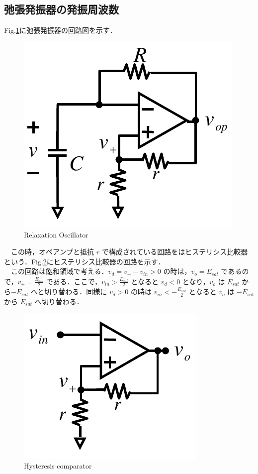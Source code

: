 \subsection{弛張発振器の発振周波数}
Fig.\ref{fig:Relaxation_Oscillator}に弛張発振器の回路図を示す．
\begin{figure}[H]
    \centering
    \includegraphics[scale=0.5]{./fig/Relaxation_Oscillator.pdf}
    \caption{Relaxation Oscillator}
    \label{fig:Relaxation_Oscillator}
\end{figure}

　この時，オペアンプと抵抗 $r$ で構成されている回路をはヒステリシス比較器という．Fig.\ref{fig:Hysteresis_comparator}にヒステリシス比較器の回路を示す．\\
　この回路は飽和領域で考える．$v_{d}=v_{+}-v_{i n}>0$ の時は，$v_{o}=E_{s a t}$ であるので，$v_{+}=\frac{E_{\text {sat}}}{2}$ である．ここで，$v_{i n}>\frac{E_{s a t}}{2}$ となると $v_{d}<0$ となり，$v_{o}$ は $E_{sat}$ から$-E_{sat}$ へと切り替わる．同様に $v_{d}>0$ の時は $v_{i n}<-\frac{E_{s a t}}{2}$ となると $v_o$ は $-E_{sat}$ から $E_{sat}$ へ切り替わる．\\
\begin{figure}[H]
    \centering
    \includegraphics[scale=0.5]{./fig/Hysteresis_comparator.pdf}
    \caption{Hysteresis comparator}
    \label{fig:Hysteresis_comparator}
\end{figure}

